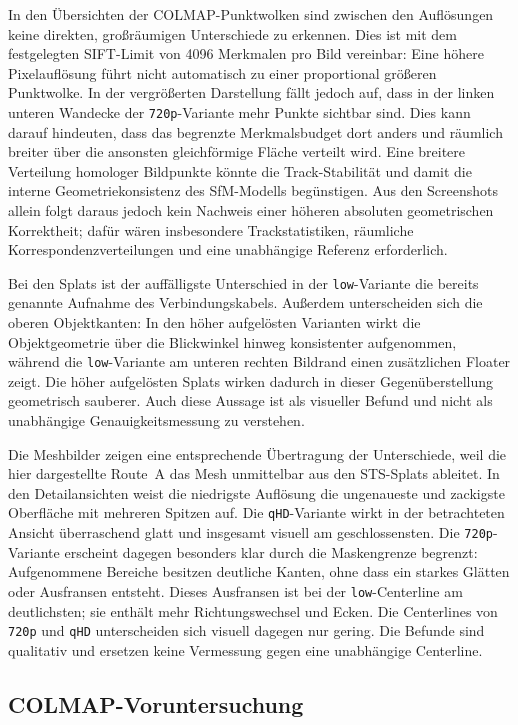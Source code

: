 In den Übersichten der COLMAP-Punktwolken sind zwischen den Auflösungen keine
direkten, großräumigen Unterschiede zu erkennen. Dies ist mit dem festgelegten
SIFT-Limit von 4096 Merkmalen pro Bild vereinbar: Eine höhere Pixelauflösung
führt nicht automatisch zu einer proportional größeren Punktwolke. In der
vergrößerten Darstellung fällt jedoch auf, dass in der linken unteren
Wandecke der \texttt{720p}-Variante mehr Punkte sichtbar sind. Dies kann darauf
hindeuten, dass das begrenzte Merkmalsbudget dort anders und räumlich breiter
über die ansonsten gleichförmige Fläche verteilt wird. Eine breitere Verteilung
homologer Bildpunkte könnte die Track-Stabilität und damit die interne
Geometriekonsistenz des SfM-Modells begünstigen. Aus den Screenshots allein
folgt daraus jedoch kein Nachweis einer höheren absoluten geometrischen
Korrektheit; dafür wären insbesondere Trackstatistiken, räumliche
Korrespondenzverteilungen und eine unabhängige Referenz erforderlich.

Bei den Splats ist der auffälligste Unterschied in der \texttt{low}-Variante
die bereits genannte Aufnahme des Verbindungskabels. Außerdem unterscheiden
sich die oberen Objektkanten: In den höher aufgelösten Varianten wirkt die
Objektgeometrie über die Blickwinkel hinweg konsistenter aufgenommen, während
die \texttt{low}-Variante am unteren rechten Bildrand einen zusätzlichen
Floater zeigt. Die höher aufgelösten Splats wirken dadurch in dieser
Gegenüberstellung geometrisch sauberer. Auch diese Aussage ist als visueller
Befund und nicht als unabhängige Genauigkeitsmessung zu verstehen.

Die Meshbilder zeigen eine entsprechende Übertragung der Unterschiede, weil
die hier dargestellte Route~A das Mesh unmittelbar aus den STS-Splats ableitet.
In den Detailansichten weist die niedrigste Auflösung die ungenaueste und
zackigste Oberfläche mit mehreren Spitzen auf. Die \texttt{qHD}-Variante wirkt
in der betrachteten Ansicht überraschend glatt und insgesamt visuell am
geschlossensten. Die \texttt{720p}-Variante erscheint dagegen besonders klar
durch die Maskengrenze begrenzt: Aufgenommene Bereiche besitzen deutliche
Kanten, ohne dass ein starkes Glätten oder Ausfransen entsteht. Dieses
Ausfransen ist bei der \texttt{low}-Centerline am deutlichsten; sie enthält
mehr Richtungswechsel und Ecken. Die Centerlines von \texttt{720p} und
\texttt{qHD} unterscheiden sich visuell dagegen nur gering. Die Befunde sind
qualitativ und ersetzen keine Vermessung gegen eine unabhängige Centerline.

\subsection{COLMAP-Voruntersuchung}

